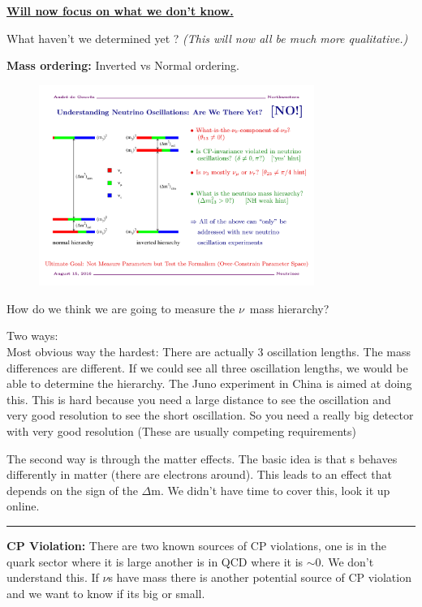 {\underline{\textbf{Will now focus on what we don't know.}}

What haven't we determined yet ?
\textit{(This will now all be much more qualitative.)}

\textbf{Mass ordering:}  Inverted vs Normal ordering. 

\begin{figure}[h!]
\centering
\includegraphics[width=0.8\textwidth]{./NuMass.pdf}
\end{figure}

How do we think we are going to measure the $\nu$\ mass hierarchy?

Two ways: \\

Most obvious way the hardest:  
There are actually 3 oscillation lengths.       
The mass differences are different. 
If we could see all three oscillation lengths, we would be able to determine the hierarchy.  
The Juno experiment in China is aimed at doing this. 
This is hard because you need a large distance to see the oscillation and very good resolution to see the short oscillation.
So you need a really big detector with very good resolution (These are usually competing requirements) 

The second way is through the matter effects. 
The basic idea is that \nue s behaves differently in matter (there are electrons around). 
This leads to an effect that depends on the sign of the $\Delta$m.
We didn't have time to cover this, look it up online.

\noindent\rule{\textwidth}{1pt}

\textbf{CP Violation:}  
There are two known sources of CP violations, one is in the quark sector where it is large another is in QCD where it is $\sim0$.
We don't understand this.  
If $\nu$s have mass there is another potential source of CP violation and we want to know if its big or small.

}
